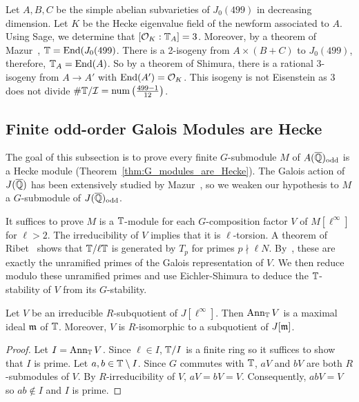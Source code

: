 \documentclass{article}
\newcommand{\I}{\mathcal{I}}
\newcommand{\odd}{\mathrm{odd}}
\begin{document}
\begin{example}
    Let $A,B,C$ be the simple abelian subvarieties of $J_0(499)$ in decreasing
    dimension. Let $K$ be the Hecke eigenvalue field of the newform associated
    to $A$. Using Sage, we determine that $[\mathcal{O}_K:\mathbb{T}_A]=3$. Moreover, by a
    theorem of Mazur~\cite{}, $\mathbb{T}=\operatorname{End}(J_0(499)$. There is a 2-isogeny from
    $A\times (B+C)$ to $J_0(499)$, therefore, $\mathbb{T}_A=\operatorname{End}(A)$. So by a theorem
    of Shimura, there is a rational 3-isogeny from $A\to A'$ with
    $\operatorname{End}(A')=\mathcal{O}_K$. This isogeny is not Eisenstein as $3$ does not divide $\#
    \TT/\I = \mathrm{num} \left(\frac{499-1}{12}\right)$.
\end{example}

\subsection{Finite odd-order Galois Modules are Hecke}%
\label{sub:finite_odd_order_galois_modules_are_hecke}

The goal of this subsection is to prove every finite $G$-submodule $M$ of
$A(\QQbar)_\odd$ is a Hecke module (Theorem~\ref{thm:G_modules_are_Hecke}).
The Galois action of $J(\overline{\mathbb{Q}})$ has been extensively studied by
Mazur~\cite{mazur:eisenstein}, so we weaken our hypothesis to $M$ a
$G$-submodule of $J(\QQbar)_\odd$. 

It suffices to prove $M$ is a $\mathbb{T}$-module for each $G$-composition factor $V$
of $M[\ell^\infty]$ for $\ell>2$. The irreducibility of $V$ implies that it is
$\ell$-torsion. A theorem of Ribet~\cite[Proposition 2]{ribet:mult_p_finite}
shows that $\mathbb{T}/\ell \mathbb{T}$ is generated by $T_p$ for primes $p\nmid \ell N$.
By~\cite[\S 14]{mazur:eisenstein}, these are exactly the unramified primes of
the Galois representation of $V$. We then reduce modulo these unramified primes
and use Eichler-Shimura to deduce the $\mathbb{T}$-stability of $V$ from its
$G$-stability.

\begin{lemma}\label{lemma:cherry_street}
    Let $V$ be an irreducible $R$-subquotient of $J[\ell^\infty]$. Then
    $\operatorname{Ann}_{\mathbb{T}} V$ is a maximal ideal $\mathfrak{m}$ of $\mathbb{T}$. Moreover, $V$ is
    $R$-isomorphic to a subquotient of $J[\mathfrak{m}]$.
\end{lemma}
\begin{proof}
    Let $I=\operatorname{Ann}_{\mathbb{T}} V$. Since $\ell\in I$, $\mathbb{T}/I$ is a finite ring so it
    suffices to show that $I$ is prime. Let $a,b\in \mathbb{T}\setminus I$. Since $G$
    commutes with $\mathbb{T}$, $aV$ and $bV$ are both $R$-submodules of $V$. By
    $R$-irreducibility of $V$, $aV=bV=V$. Consequently, $abV=V$ so $ab\notin I$
    and $I$ is prime.
\end{proof}
\end{document}
